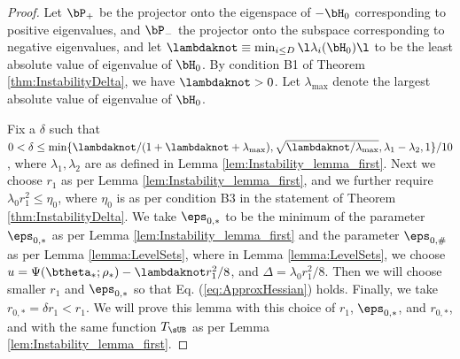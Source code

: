 \documentclass[11pt]{article}
\begin{document}
\begin{proof}


Let $\bP_+$ be the projector onto the eigenspace of $-\bH_0$ corresponding to positive eigenvalues, and 
$\bP_-$ the projector onto the subspace corresponding to negative eigenvalues, and let $\lambdaknot\equiv \min_{i\le D} \l \lambda_i(\bH_0) \l$ to be the least absolute value of eigenvalue of $\bH_0$. By condition {\sf B1} of Theorem \ref{thm:InstabilityDelta}, we have $\lambdaknot > 0$. Let $\lambda_{\max}$ denote the largest absolute value of eigenvalue of $\bH_0$.

Fix a $\delta$ such that $0 < \delta \le \min\{\lambdaknot/(1 + \lambdaknot + \lambda_{\max}), \sqrt{\lambdaknot/\lambda_{\max}}, \lambda_1 - \lambda_2, 1\} /10$, where $\lambda_1, \lambda_2$ are as defined in Lemma \ref{lem:Instability_lemma_first}. Next we choose $r_1$ as per Lemma \ref{lem:Instability_lemma_first}, and we further require $\lambda_0 r_1^2 \le \eta_0$, where $\eta_0$ is as per condition {\sf B3} in the statement of Theorem \ref{thm:InstabilityDelta}. We take $\eps_{0, *}$ to be the minimum of the parameter $\eps_{0, *}$ as per Lemma \ref{lem:Instability_lemma_first} and the parameter $\eps_{0, \#}$ as per Lemma \ref{lemma:LevelSets}, where in Lemma \ref{lemma:LevelSets}, we choose $u = \Psi(\btheta_*;\rho_*) - \lambdaknot r_1^2/8$, and $\Delta = \lambda_0 r_1^2/8$. Then we will choose smaller $r_1$ and $\eps_{0, *}$ so that Eq. (\ref{eq:ApproxHessian}) holds. Finally, we take $r_{0, *} = \delta r_1 < r_1$. We will prove this lemma with this choice of $r_1$, $\eps_{0, *}$, and $r_{0, *}$, and with the same function $T_{\sUB}$ as per Lemma \ref{lem:Instability_lemma_first}. 


\end{proof}
\end{document}
